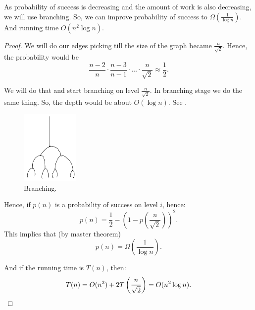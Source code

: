 \begin{algorithm} \label{alg:cargos_improved}
    As probability of success is decreasing and the amount of work is also decreasing, we will use branching.
    So, we can improve probability of success to $\Omega\left(\frac 1 {\log n}\right)$.
    And running time $O(n^2 \log n)$.
\end{algorithm}
\begin{proof}
    We will do our edges picking till the size of the graph became $\frac n {\sqrt 2}$.
    Hence, the probability would be
    \[
        \frac{n - 2}{n} \cdot \frac{n - 3}{n - 1} \cdot \dots \cdot \frac n {\sqrt 2} \approx \frac 1 2.
    \]

    We will do that and start branching on level $\frac n {\sqrt 2}$.
    In branching stage we do the same thing.
    So, the depth would be about $O(\log n)$.
    See .
  \begin{figure}[H]
        \centering
        \includegraphics[width=0.25\textwidth]{figures/39E45206-D894-4971-BFD2-A3A3A310C2B6}
        \caption{Branching.}
        \label{fig:39e45206-d894-4971-bfd2-a3a3a310c2b6}
    \end{figure}

    Hence, if $p(n)$ is a probability of success on level $i$, hence:
    \[
        p(n) = \frac 1 2 - \left(1 - p\left(\frac n {\sqrt 2}\right)\right)^2.
    \]
    This implies that (by master theorem)
    \[
        p(n) = \Omega\left(\frac 1 {\log n}\right).
    \]

    And if the running time is $T(n)$, then:
    \[
        T(n) = O(n^2) + 2 T\left(\frac n {\sqrt 2}\right) = O(n^2 \log n). \qedhere
    \]
\end{proof}

